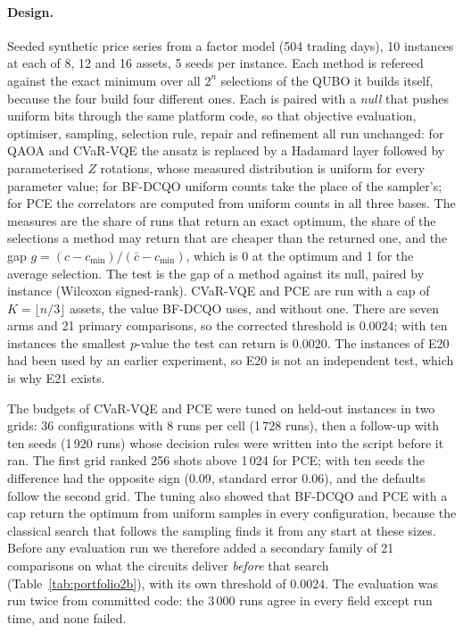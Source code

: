 \documentclass[11pt,a4paper]{article}
\begin{document}
\paragraph{Design.} Seeded synthetic price series from a factor model (504
trading days), 10 instances at each of
8, 12 and 16 assets, 5 seeds per instance. Each method is refereed against
the exact minimum over all $2^n$ selections of
the QUBO it builds itself, because the four build four different ones. Each
is paired with a \emph{null} that pushes uniform bits through the same
platform code, so that objective evaluation, optimiser, sampling, selection
rule, repair and refinement all run unchanged: for QAOA and
CVaR-VQE the ansatz is replaced by a Hadamard layer followed by
parameterised $Z$ rotations, whose measured distribution is uniform for
every parameter value; for BF-DCQO
uniform counts take the place of the sampler's; for PCE the correlators are
computed from
uniform counts in all three bases. The measures are the share of runs that
return an exact optimum, the share of the selections a method may return
that are cheaper than the returned one, and the gap
$g = (c - c_{\min})/(\bar c - c_{\min})$, which is 0 at the optimum and 1
for the average selection. The test is the gap of a method against its
null, paired by instance (Wilcoxon signed-rank).
CVaR-VQE and PCE are run with a cap of
$K = \lfloor n/3\rfloor$ assets, the value BF-DCQO uses, and without one.
There are seven arms and 21 primary comparisons, so the corrected threshold
is $0.0024$; with ten instances the smallest $p$-value the test can return
is $0.0020$. The instances of E20 had been used by an earlier experiment,
so E20 is not an independent test, which is why E21 exists.

The budgets of CVaR-VQE and PCE were tuned on
held-out instances in two grids: 36 configurations with 8 runs per cell
(1\,728 runs), then a follow-up with ten seeds (1\,920 runs) whose decision
rules were written into the script before it ran. The first grid ranked 256
shots above 1\,024 for PCE; with ten seeds the difference had the opposite
sign ($0.09$, standard error $0.06$), and the defaults follow the second
grid. The tuning also showed that BF-DCQO and PCE with a cap return the
optimum from uniform samples in every configuration, because the classical
search that follows the sampling finds it from any start at these sizes.
Before any evaluation run we therefore added a secondary family of 21
comparisons on what the circuits deliver \emph{before} that search
(Table~\ref{tab:portfolio2b}), with its own threshold of $0.0024$. The
evaluation was run twice from committed code: the 3\,000 runs agree in every
field except run time, and none failed.
\end{document}

